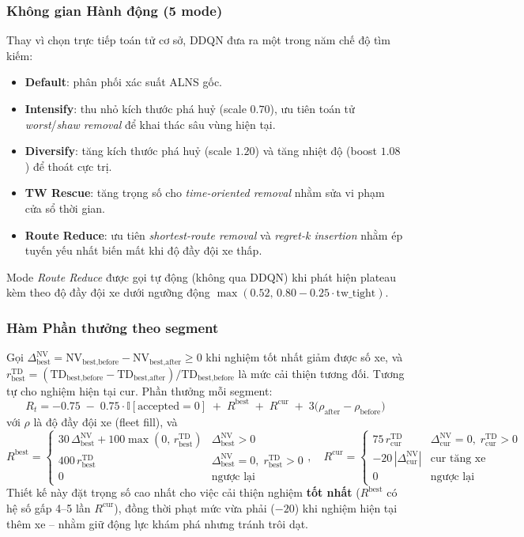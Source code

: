 \documentclass[13pt, a4paper]{extarticle} %
\begin{document}
\subsubsection{Không gian Hành động (5 mode)}
Thay vì chọn trực tiếp toán tử cơ sở, DDQN đưa ra một trong năm chế độ tìm kiếm:
\begin{itemize}
    \item \textbf{Default}: phân phối xác suất ALNS gốc.
    \item \textbf{Intensify}: thu nhỏ kích thước phá huỷ (scale $0.70$), ưu tiên toán tử \textit{worst}/\textit{shaw removal} để khai thác sâu vùng hiện tại.
    \item \textbf{Diversify}: tăng kích thước phá huỷ (scale $1.20$) và tăng nhiệt độ (boost $1.08$) để thoát cực trị.
    \item \textbf{TW Rescue}: tăng trọng số cho \textit{time-oriented removal} nhằm sửa vi phạm cửa sổ thời gian.
    \item \textbf{Route Reduce}: ưu tiên \textit{shortest-route removal} và \textit{regret-k insertion} nhằm ép tuyến yếu nhất biến mất khi độ đầy đội xe thấp.
\end{itemize}
Mode \textit{Route Reduce} được gọi tự động (không qua DDQN) khi phát hiện plateau kèm theo độ đầy đội xe dưới ngưỡng động $\max(0.52,\, 0.80 - 0.25 \cdot \text{tw\_tight})$.

\subsubsection{Hàm Phần thưởng theo segment}
Gọi $\Delta_{\text{best}}^{\text{NV}} = \text{NV}_{\text{best,before}} - \text{NV}_{\text{best,after}} \ge 0$ khi nghiệm tốt nhất giảm được số xe, và $r_{\text{best}}^{\text{TD}} = (\text{TD}_{\text{best,before}} - \text{TD}_{\text{best,after}})/\text{TD}_{\text{best,before}}$ là mức cải thiện tương đối. Tương tự cho nghiệm hiện tại $\text{cur}$. Phần thưởng mỗi segment:
\[
R_t = -0.75 \;-\; 0.75 \cdot \mathbb{I}[\text{accepted}=0] \;+\; R^{\text{best}} \;+\; R^{\text{cur}} \;+\; 3\big(\rho_{\text{after}} - \rho_{\text{before}}\big)
\]
với $\rho$ là độ đầy đội xe (fleet fill), và
\[
R^{\text{best}} = \begin{cases}
30\,\Delta_{\text{best}}^{\text{NV}} + 100\max(0,\, r_{\text{best}}^{\text{TD}}) & \Delta_{\text{best}}^{\text{NV}} > 0 \\
400\, r_{\text{best}}^{\text{TD}} & \Delta_{\text{best}}^{\text{NV}} = 0,\; r_{\text{best}}^{\text{TD}} > 0 \\
0 & \text{ngược lại}
\end{cases},\quad
R^{\text{cur}} = \begin{cases}
75\, r_{\text{cur}}^{\text{TD}} & \Delta_{\text{cur}}^{\text{NV}} = 0,\; r_{\text{cur}}^{\text{TD}} > 0 \\
-20\, |\Delta_{\text{cur}}^{\text{NV}}| & \text{cur tăng xe} \\
0 & \text{ngược lại}
\end{cases}
\]
Thiết kế này đặt trọng số cao nhất cho việc cải thiện nghiệm \textbf{tốt nhất} ($R^{\text{best}}$ có hệ số gấp 4--5 lần $R^{\text{cur}}$), đồng thời phạt mức vừa phải ($-20$) khi nghiệm hiện tại thêm xe -- nhằm giữ động lực khám phá nhưng tránh trôi dạt.
\end{document}
